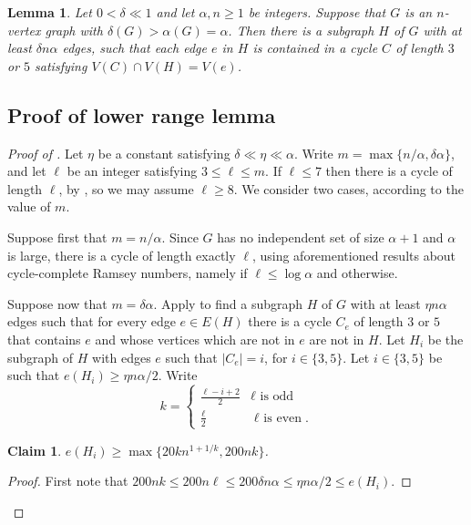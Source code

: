 \documentclass[11pt,english]{article}
\theoremstyle{plain}
\newtheorem{lemma}[theorem]{Lemma}
\newtheorem{claim}[theorem]{Claim}
\theoremstyle{definition}
\theoremstyle{remark}
\begin{document}
		\begin{lemma} \label{lem:odd-cycles}
			Let $0 < \delta \ll 1$ and let $\alpha, n \ge 1$ be integers.
			Suppose that $G$ is an $n$-vertex graph with $\delta(G) > \alpha(G) = \alpha$.
			Then there is a subgraph $H$ of $G$ with at least $\delta n \alpha$ edges, such that each edge $e$ in $H$ is contained in a cycle $C$ of length $3$ or $5$ satisfying $V(C) \cap V(H) = V(e)$.
		\end{lemma}



	\subsection{Proof of lower range lemma} \label{sec:lower-short-cycles}

		\begin{proof}[Proof of ]
			Let $\eta$ be a constant satisfying $\delta \ll \eta \ll \alpha$.
			Write $m = \max\{n/\alpha, \delta \alpha\}$, and let $\ell$ be an integer satisfying $3 \le \ell \le m$.
			If $\ell \le 7$ then there is a cycle of length $\ell$, by , so we may assume $\ell \ge 8$.
			We consider two cases, according to the value of $m$.

			Suppose first that $m = n/\alpha$.
			Since $G$ has no independent set of size $\alpha+1$ and $\alpha$ is large, there is a cycle of length exactly $\ell$, using aforementioned results about cycle-complete Ramsey numbers, namely  if $\ell \le \log \alpha$ and  otherwise.

			Suppose now that $m = \delta \alpha$.
			Apply  to find a subgraph $H$ of $G$ with at least $\eta n \alpha$ edges such that for every edge $e \in E(H)$ there is a cycle $C_e$ of length $3$ or $5$ that contains $e$ and whose vertices which are not in $e$ are not in $H$.
			Let $H_i$ be the subgraph of $H$ with edges $e$ such that $|C_e| = i$, for $i \in \{3,5\}$.
			Let $i \in \{3,5\}$ be such that $e(H_i) \ge \eta n \alpha / 2$.
			Write 
			\begin{equation*}
				k = \left\{
					\begin{array}{ll}
						\frac{\ell - i + 2}{2} & \text{$\ell$ is odd} \\
						\frac{\ell}{2} & \text{$\ell$ is even}.
					\end{array}
					\right.
			\end{equation*}
			\begin{claim}
				$e(H_i) \ge \max\{20k n^{1+1/k}, 200nk\}$.
			\end{claim}
			\begin{proof}
				First note that $200nk \le 200 n \ell \le 200 \delta n \alpha \le \eta n \alpha / 2 \le e(H_i)$. 


\end{proof}
\end{proof}
\end{document}
